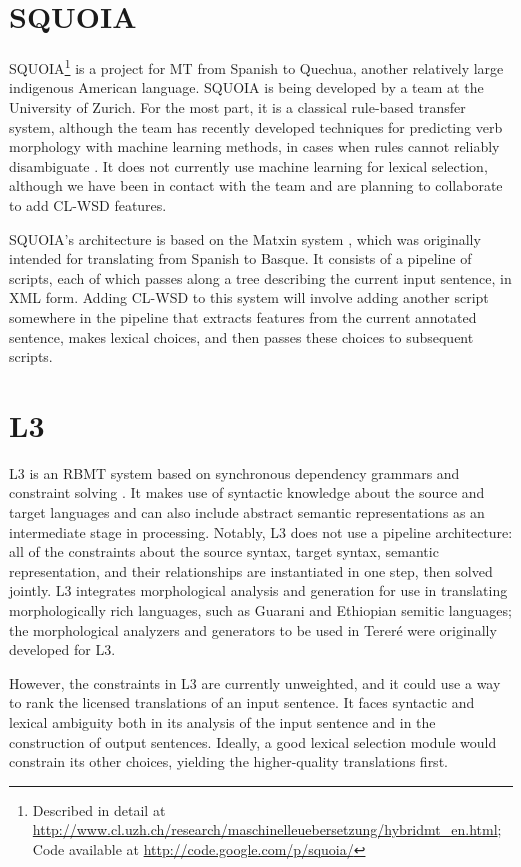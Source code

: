 \section{SQUOIA}
SQUOIA\footnote{Described in detail at
\url{http://www.cl.uzh.ch/research/maschinelleuebersetzung/hybridmt_en.html}; 
Code available at \url{http://code.google.com/p/squoia/}}
is a project for MT from Spanish to Quechua, another relatively large
indigenous American language. SQUOIA is being developed by a team at the
University of Zurich. For the most part, it is a classical rule-based transfer
system, although the team has recently developed techniques for predicting verb
morphology with machine learning methods, in cases when rules cannot reliably
disambiguate \cite{riosgonzales-gohring:2013:HyTra}. It does not currently use
machine learning for lexical selection, although we have been in contact with
the team and are planning to collaborate to add CL-WSD features.

SQUOIA's architecture is based on the Matxin system \cite{matxin_2005}, which
was originally intended for translating from Spanish to Basque.
It consists of a pipeline of scripts, each of which passes along a tree
describing the current input sentence, in XML form. Adding CL-WSD to this
system will involve adding another script somewhere in the pipeline that
extracts features from the current annotated sentence, makes lexical choices,
and then passes these choices to subsequent scripts.

\section{L3}
L3 is an RBMT system based on synchronous dependency grammars and constraint
solving \cite{gasser:sxdg,gasser:aflat2012}.  It makes use of syntactic
knowledge about the source and target languages and can also include abstract
semantic representations as an intermediate stage in processing. Notably, L3
does not use a pipeline architecture: all of the constraints about the source
syntax, target syntax, semantic representation, and their relationships are
instantiated in one step, then solved jointly. L3 integrates morphological
analysis and generation for use in translating morphologically rich languages,
such as Guarani and Ethiopian semitic languages;
the morphological analyzers and generators to be used in Tereré were originally
developed for L3.

However, the constraints in L3 are currently unweighted, and it could use a way
to rank the licensed translations of an input sentence. It faces syntactic and
lexical ambiguity both in its analysis of the input sentence and in the
construction of output sentences. Ideally, a good lexical selection module
would constrain its other choices, yielding the higher-quality translations
first.

